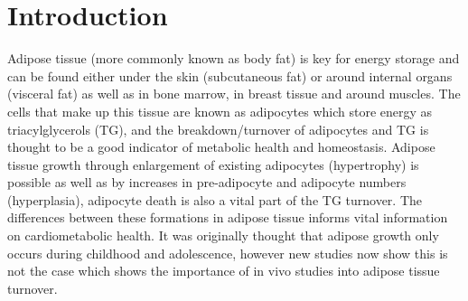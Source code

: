 \documentclass[class=article, crop=false]{standalone}
\begin{document}
 
\label{section:Lipid}

\section{Introduction}

Adipose tissue (more commonly known as body fat) is key for energy storage and can be found either under the skin (subcutaneous fat) or around internal organs (visceral fat) as well as in bone marrow, in breast tissue and around muscles. The cells that make up this tissue are known as adipocytes which store energy as triacylglycerols (TG), and the breakdown/turnover of adipocytes and TG is thought to be a good indicator of metabolic health and homeostasis. Adipose tissue growth through enlargement of existing adipocytes (hypertrophy) is possible as well as by increases in pre-adipocyte and adipocyte numbers (hyperplasia), adipocyte death is also a vital part of the TG turnover\cite{White2019DynamicsDisease}. The differences between these formations in adipose tissue informs vital information on cardiometabolic health\cite{Carnethon2002Serum19871998}. It was originally thought that adipose growth only occurs during childhood and adolescence\cite{Salans1973StudiesPatients}, however new studies now show this is not the case\cite{White2016DifferencesWomen} which shows the importance of in vivo studies into adipose tissue turnover.
\end{document}
